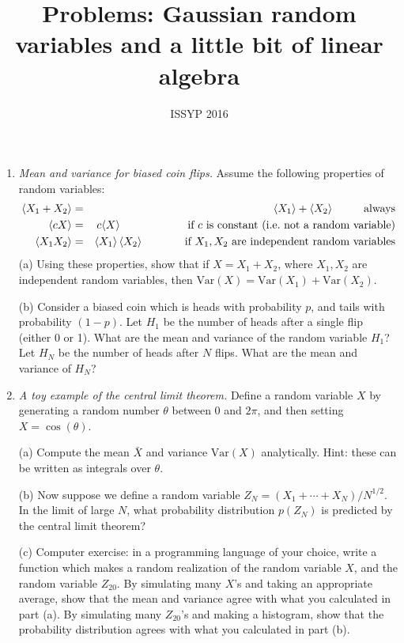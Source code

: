\documentclass[aps,prd,superscriptaddress,groupedaddress,nofootinbib,nobibnotes]{revtex4}
\newcommand{\ba}{\begin{eqnarray}}
\newcommand{\ea}{\end{eqnarray}}
\newcommand{\nn}{\nonumber}
\def\Var{\mbox{Var}}
\begin{document}
\title{Problems: Gaussian random variables and a little bit of linear algebra}

\author{ISSYP 2016}


\maketitle

\begin{enumerate}

\item {\em Mean and variance for biased coin flips.}
Assume the following properties of random variables:
\ba
\langle X_1 + X_2 \rangle &=& \langle X_1 \rangle + \langle X_2 \rangle \hspace{1cm} \mbox{always} \nn \\
\langle c X \rangle &=& c \langle X \rangle \hspace{2.15cm} \mbox{if $c$ is constant (i.e.~not a random variable)} \nn \\
\langle X_1 X_2 \rangle &=& \langle X_1 \rangle \, \langle X_2 \rangle \hspace{1.37cm} \mbox{if $X_1,X_2$ are independent random variables}
\ea
(a) Using these properties, show that if $X = X_1 + X_2$, where $X_1,X_2$ are independent random variables, then $\Var(X) = \Var(X_1) + \Var(X_2)$.
\par\medskip
(b) Consider a biased coin which is heads with probability $p$, and tails with probability $(1-p)$.
Let $H_1$ be the number of heads after a single flip (either 0 or 1).  What are the mean and variance of the random variable $H_1$?
Let $H_N$ be the number of heads after $N$ flips.  What are the mean and variance of $H_N$?

\item {\em A toy example of the central limit theorem.}
Define a random variable $X$ by generating a random number $\theta$ between 0 and $2\pi$, and
then setting $X = \cos(\theta)$.
\par\medskip
(a) Compute the mean $\bar X$ and variance $\Var(X)$ analytically.  Hint: these can be written as integrals over $\theta$.
\par\medskip
(b) Now suppose we define a random variable $Z_N = (X_1 + \cdots + X_N) / N^{1/2}$.  In the limit of large $N$,
what probability distribution $p(Z_N)$ is predicted by the central limit theorem?
\par\medskip
(c) Computer exercise: in a programming language of your choice, write a function which makes a random realization of the
random variable $X$, and the random variable $Z_{20}$.  By simulating many $X$'s and taking an appropriate average, show 
that the mean and variance agree with what you calculated in part (a).  By simulating many $Z_{20}$'s and making a histogram,
show that the probability distribution agrees with what you calculated in part (b).


\end{enumerate}
\end{document}

